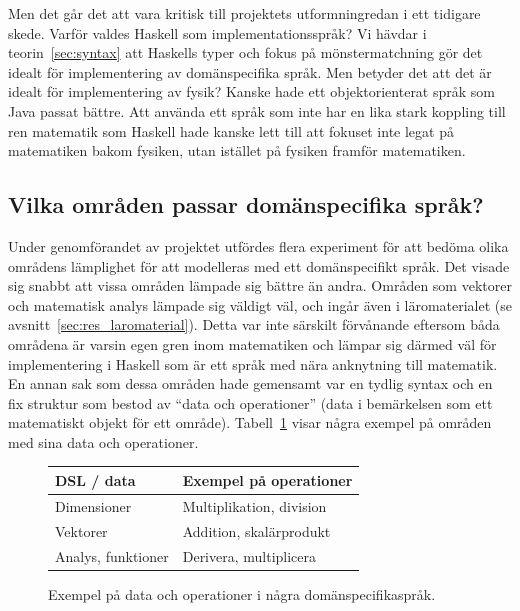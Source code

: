 Men det går det att vara kritisk till projektets utformningredan i ett tidigare
skede. Varför
valdes Haskell som implementationsspråk? Vi hävdar i teorin~\ref{sec:syntax} att
Haskells typer och fokus på mönstermatchning gör det idealt för implementering
av domänspecifika språk. Men betyder det att det är idealt för implementering
av fysik? Kanske hade ett objektorienterat språk som Java passat bättre. Att
använda ett språk som inte har en lika stark koppling till ren matematik som
Haskell hade kanske lett till att fokuset inte legat på matematiken
bakom fysiken, utan istället på fysiken framför matematiken.

\subsection{Vilka områden passar domänspecifika språk?}\label{sec:lampligt}

Under genomförandet av projektet utfördes flera experiment för att bedöma olika
områdens lämplighet för att modelleras med ett domänspecifikt språk. Det visade
sig snabbt att vissa områden lämpade sig bättre än andra. Områden
som vektorer och matematisk analys lämpade sig väldigt väl, och ingår även i
läromaterialet (se avsnitt~\ref{sec:res_laromaterial}). Detta var inte särskilt
förvånande eftersom båda områdena är varsin egen gren inom matematiken
och lämpar sig därmed väl för implementering i Haskell som är ett språk med nära
anknytning till matematik. En annan sak som dessa områden hade
gemensamt var en tydlig syntax och en fix struktur som bestod av ``data och
operationer'' (data i bemärkelsen som ett matematiskt objekt för ett område). Tabell~\ref{tab:data_och_ops} visar några exempel på områden med
sina data och operationer.

\captionsetup[figure]{name=Tabell}

\begin{figure}[tph]
\centering
\caption{Exempel på data och operationer i några domänspecifikaspråk.}\label{tab:data_och_ops}
\begin{tabular}{l|l}
\toprule
DSL / data & Exempel på operationer \\ \midrule
Dimensioner & Multiplikation, division \\
Vektorer & Addition, skalärprodukt \\
Analys, funktioner & Derivera, multiplicera \\ \bottomrule
\end{tabular}
\end{figure}

